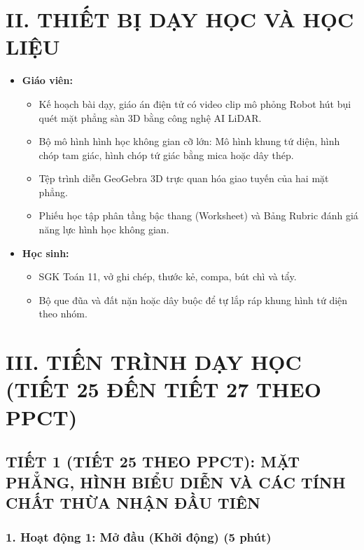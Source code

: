 \documentclass[12pt, a4paper]{article}
\begin{document}
\section*{II. THIẾT BỊ DẠY HỌC VÀ HỌC LIỆU}

\begin{itemize}[leftmargin=1.2cm]
    \item \textbf{Giáo viên:}
    \begin{itemize}[leftmargin=0.6cm]
        \item Kế hoạch bài dạy, giáo án điện tử có video clip mô phỏng Robot hút bụi quét mặt phẳng sàn 3D bằng công nghệ AI LiDAR.
        \item Bộ mô hình hình học không gian cỡ lớn: Mô hình khung tứ diện, hình chóp tam giác, hình chóp tứ giác bằng mica hoặc dây thép.
        \item Tệp trình diễn GeoGebra 3D trực quan hóa giao tuyến của hai mặt phẳng.
        \item Phiếu học tập phân tầng bậc thang (Worksheet) và Bảng Rubric đánh giá năng lực hình học không gian.
    \end{itemize}
    \item \textbf{Học sinh:}
    \begin{itemize}[leftmargin=0.6cm]
        \item SGK Toán 11, vở ghi chép, thước kẻ, compa, bút chì và tẩy.
        \item Bộ que đũa và đất nặn hoặc dây buộc để tự lắp ráp khung hình tứ diện theo nhóm.
    \end{itemize}
\end{itemize}

\section*{III. TIẾN TRÌNH DẠY HỌC (TIẾT 25 ĐẾN TIẾT 27 THEO PPCT)}

\subsection*{TIẾT 1 (TIẾT 25 THEO PPCT): MẶT PHẲNG, HÌNH BIỂU DIỄN VÀ CÁC TÍNH CHẤT THỪA NHẬN ĐẦU TIÊN}

\subsubsection*{1. Hoạt động 1: Mở đầu (Khởi động) (5 phút)}
\end{document}
